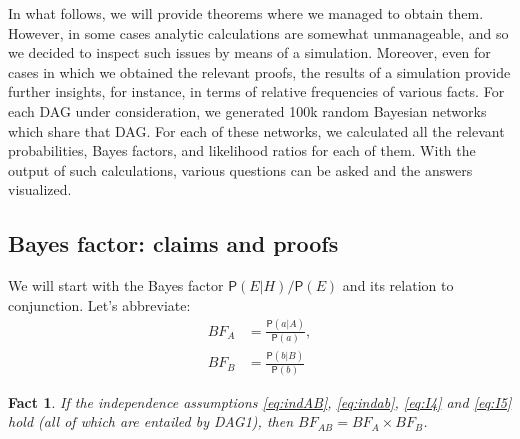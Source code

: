\documentclass[
  10pt,
  dvipsnames,enabledeprecatedfontcommands]{scrartcl}
\newtheorem{fact}{Fact}
\newcommand{\pr}[1]{\ensuremath{\mathsf{P}(#1)}}
\begin{document}
In what follows, we will provide theorems where we managed to obtain
them. However, in some cases analytic calculations are somewhat
unmanageable, and so we decided to inspect such issues by means of a
simulation. Moreover, even for cases in which we obtained the relevant
proofs, the results of a simulation provide further insights, for
instance, in terms of relative frequencies of various facts. For each
DAG under consideration, we generated 100k random Bayesian networks
which share that DAG. For each of these networks, we calculated all the
relevant probabilities, Bayes factors, and likelihood ratios for each of
them. With the output of such calculations, various questions can be
asked and the answers visualized.

\hypertarget{bayes-factor-claims-and-proofs}{%
\subsection*{Bayes factor: claims and
proofs}\label{bayes-factor-claims-and-proofs}}

We will start with the Bayes factor \(\pr{E \vert H}/\pr{E}\) and its
relation to conjunction. Let's abbreviate: \begin{align*}
BF_A  & =  \frac{\pr{a \vert A}}{\pr{a}},\\
BF_B & = \frac{\pr{b \vert B}}{\pr{b}}
\end{align*}

\begin{fact} If the independence assumptions \eqref{eq:indAB}, \eqref{eq:indab}, \eqref{eq:I4} and \eqref{eq:I5} hold (all of which are entailed by \textsf{DAG1}), then 
$BF_{AB} = BF_A \times BF_B$. \label{fac:BFindep}
\end{fact}
\end{document}
